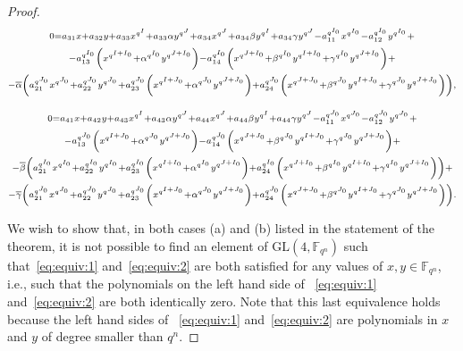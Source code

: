 \begin{proof}
\begin{gather}
\label{eq:equiv:1}
       \scriptstyle 0 = a_{31}x + a_{32} y  + a_{33}x^{q^I} + a_{33}\alpha y ^{q^J} + a_{34}x^{q^J} + a_{34}\beta y ^{q^I} + a_{34}\gamma  y ^{q^J} - a_{11}^{q^{I_0}}x^{q^{I_0}} - a_{12}^{q^{I_0}} y ^{q^{I_0}} + \\
        \scriptstyle \notag - a_{13}^{q^{I_0}}\left(x^{q^{I + I_0}} + \alpha^{q^{I_0}} y ^{q^{J + I_0}}\right) - a_{14}^{q^{I_0}}\left(x^{q^{J + I_0}} + \beta^{q^{I_0}} y ^{q^{I + I_0}} + \gamma^{q^{I_0}} y ^{q^{J + I_0}}\right) + \\
       \scriptstyle \notag - \overline{\alpha}\left(a_{21}^{q^{J_0}}x^{q^{J_0}} + a_{22}^{q^{J_0}} y ^{q^{J_0}} +  a_{23}^{q^{J_0}}\left(x^{q^{I + J_0}} + \alpha^{q^{J_0}} y ^{q^{J + J_0}}\right) +  a_{24}^{q^{J_0}}\left(x^{q^{J + J_0}}  + \beta^{q^{J_0}} y ^{q^{I + J_0}} +  \gamma^{q^{J_0}} y ^{q^{J + J_0}}\right)\right),
\end{gather}

\begin{gather}
\label{eq:equiv:2}
       \scriptstyle 0 = a_{41}x + a_{42} y  + a_{43}x^{q^I} + a_{43}\alpha y ^{q^J} + a_{44}x^{q^J} + a_{44}\beta y ^{q^I} + a_{44}\gamma  y ^{q^J} - a_{11}^{q^{J_0}}x^{q^{J_0}} - a_{12}^{q^{J_0}} y ^{q^{J_0}} + \\
      \scriptstyle \notag - a_{13}^{q^{J_0}}\left(x^{q^{I + J_0}} + \alpha^{q^{J_0}} y ^{q^{J + J_0}}\right) - a_{14}^{q^{J_0}}\left(x^{q^{J + J_0}} + \beta^{q^{J_0}} y ^{q^{I + J_0}} + \gamma^{q^{J_0}} y ^{q^{J + J_0}}\right) + \\
      \scriptstyle \notag  - \overline{\beta}\left(a_{21}^{q^{I_0}}x^{q^{I_0}}  +  a_{22}^{q^{I_0}} y ^{q^{I_0}}  +  a_{23}^{q^{I_0}}\left(x^{q^{I + I_0}}  +  \alpha^{q^{I_0}} y ^{q^{J + I_0}}\right)  +  a_{24}^{q^{I_0}}\left(x^{q^{J + I_0}}  +  \beta^{q^{I_0}} y ^{q^{I + I_0}}   +  \gamma^{q^{I_0}} y ^{q^{J + I_0}}\right)\right)+\\
       \scriptstyle \notag  - \overline{\gamma}\left(a_{21}^{q^{J_0}}x^{q^{J_0}}  +  a_{22}^{q^{J_0}} y ^{q^{J_0}}  +  a_{23}^{q^{J_0}}\left(x^{q^{I + J_0}}  +  \alpha^{q^{J_0}} y ^{q^{J + J_0}}\right)  +  a_{24}^{q^{J_0}}\left(x^{q^{J + J_0}}  +  \beta^{q^{J_0}} y ^{q^{I + J_0}}  +  \gamma^{q^{J_0}} y ^{q^{J + J_0}}\right)\right). 
\end{gather}

We wish to show that, in both cases (a) and (b) listed in the statement of the theorem, it is not possible to find an element of $\mathrm{GL}(4,\mathbb{F}_{q^n})$ such that~\eqref{eq:equiv:1} and~\eqref{eq:equiv:2} are both satisfied for any values of $x, y \in {\mathbb F}_{q^n}$, i.e., such that the polynomials on the left hand side of ~\eqref{eq:equiv:1} and~\eqref{eq:equiv:2} are both identically zero. Note that this last equivalence holds because the left hand sides of ~\eqref{eq:equiv:1} and~\eqref{eq:equiv:2} are polynomials in $x$ and $ y $ of degree smaller than $q^n$.


\end{proof}
